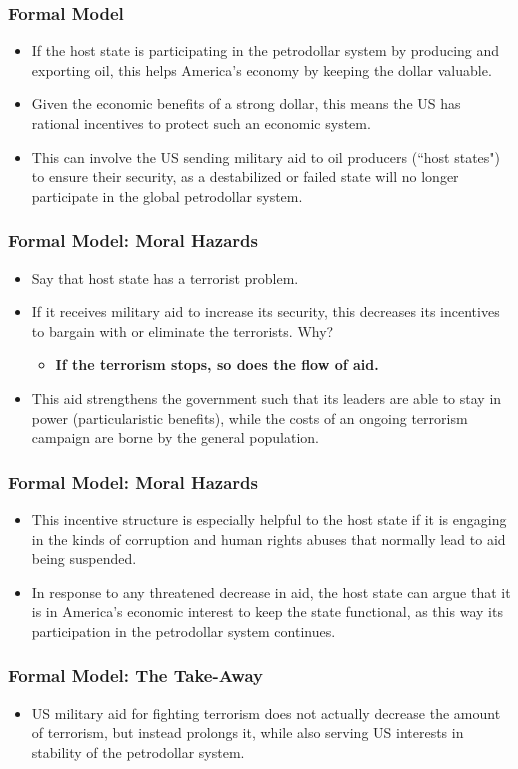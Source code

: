 \documentclass{beamer}
\begin{document}
\begin{frame} 
	\frametitle{\LARGE{Formal Model}}
	\begin{itemize}
		\item If the host state is participating in the petrodollar system by producing and exporting oil, this helps America's economy by keeping the dollar valuable. \pause
		\item Given the economic benefits of a strong dollar, this means the US has rational incentives to protect such an economic system. \pause
		\item This can involve the US sending military aid to oil producers (``host states") to ensure their security, as a destabilized or failed state will no longer participate in the global petrodollar system.
	\end{itemize}
\end{frame}

\begin{frame} 
	\frametitle{\LARGE{Formal Model: Moral Hazards}}
	\begin{itemize}
		\item Say that host state has a terrorist problem. \pause
		\item If it receives military aid to increase its security, this decreases its incentives to bargain with or eliminate the terrorists. Why? \pause
		\begin{itemize}
			\item \textbf{If the terrorism stops, so does the flow of aid.}
		\end{itemize}
		\item This aid strengthens the government such that its leaders are able to stay in power (particularistic benefits), while the costs of an ongoing terrorism campaign are borne by the general population.
	\end{itemize}
\end{frame}

\begin{frame} 
	\frametitle{\LARGE{Formal Model: Moral Hazards}}
	\begin{itemize}
		\item This incentive structure is especially helpful to the host state if it is engaging in the kinds of corruption and human rights abuses that normally lead to aid being suspended. \pause
		\item In response to any threatened decrease in aid, the host state can argue that it is in America's economic interest to keep the state functional, as this way its participation in the petrodollar system continues. 
	\end{itemize}
\end{frame}

\begin{frame} 
	\frametitle{\LARGE{Formal Model: The Take-Away}}
	\begin{itemize}
		\item US military aid for fighting terrorism does not actually decrease the amount of terrorism, but instead prolongs it, while also serving US interests in stability of the petrodollar system.
	\end{itemize}
\end{frame}
\end{document}

